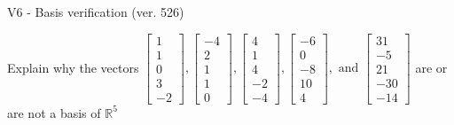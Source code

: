\begin{exercise}
  \begin{exerciseTitle}V6 - Basis verification (ver. 526)\end{exerciseTitle}
  \begin{exerciseStatement}
    Explain why the vectors \(\left[\begin{array}{r}
1 \\
1 \\
0 \\
3 \\
-2
\end{array}\right] , \left[\begin{array}{r}
-4 \\
2 \\
1 \\
1 \\
0
\end{array}\right] , \left[\begin{array}{r}
4 \\
1 \\
4 \\
-2 \\
-4
\end{array}\right] , \left[\begin{array}{r}
-6 \\
0 \\
-8 \\
10 \\
4
\end{array}\right] , \text{ and } \left[\begin{array}{r}
31 \\
-5 \\
21 \\
-30 \\
-14
\end{array}\right]\) are or are not a basis of \(\mathbb{R}^5\)	



\end{exerciseStatement}
\end{exercise}
